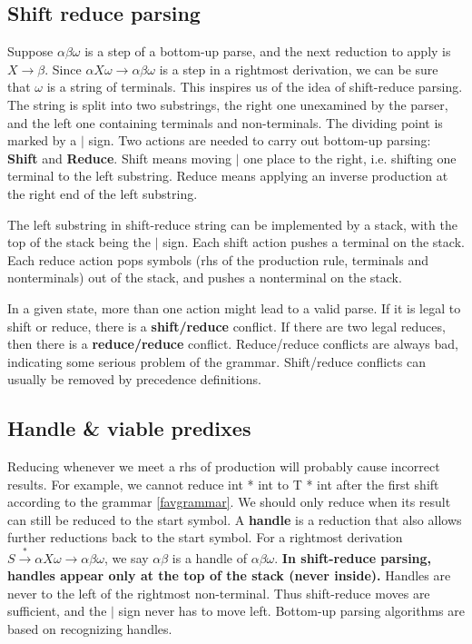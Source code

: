 \subsection{Shift reduce parsing}
Suppose $\alpha\beta\omega$ is a step of a bottom-up parse, and the next reduction to apply is $X\rightarrow\beta$. Since $\alpha X\omega\rightarrow\alpha\beta\omega$ is a step in a rightmost derivation, we can be sure that $\omega$ is a string of terminals. This inspires us of the idea of shift-reduce parsing. The string is split into two substrings, the right one unexamined by the parser, and the left one containing terminals and non-terminals. The dividing point is marked by a $|$ sign. Two actions are needed to carry out bottom-up parsing: \textbf{Shift} and \textbf{Reduce}. Shift means moving $|$ one place to the right, i.e. shifting one terminal to the left substring. Reduce means applying an inverse production at the right end of the left substring.

The left substring in shift-reduce string can be implemented by a stack, with the top of the stack being the $|$ sign. Each shift action pushes a terminal on the stack. Each reduce action pops symbols (rhs of the production rule, terminals and nonterminals) out of the  stack, and pushes a nonterminal on the stack. 

In a given state, more than one action might lead to a valid parse. If it is legal to shift or reduce, there is a \textbf{shift/reduce} conflict. If there are two legal reduces, then there is a \textbf{reduce/reduce} conflict. Reduce/reduce conflicts are always bad, indicating some serious problem of the grammar. Shift/reduce conflicts can usually be removed by precedence definitions.
\subsection{Handle \& viable predixes}
Reducing whenever we meet a rhs of production will probably cause incorrect results. For example, we cannot reduce int * int to T * int after the first shift according to the grammar \eqref{favgrammar}. We should only reduce when its result can still be reduced to the start symbol. A \textbf{handle} is a reduction that also allows further reductions back to the start symbol. For a rightmost derivation $S\xrightarrow{*}\alpha X\omega\rightarrow\alpha\beta\omega$, we say $\alpha\beta$ is a handle of $\alpha\beta\omega$. \textbf{In shift-reduce parsing, handles appear only at the top of the stack (never inside).} Handles are never to the left of the rightmost non-terminal. Thus shift-reduce moves are sufficient, and the $|$ sign never has to move left. Bottom-up parsing algorithms are based on recognizing handles.


